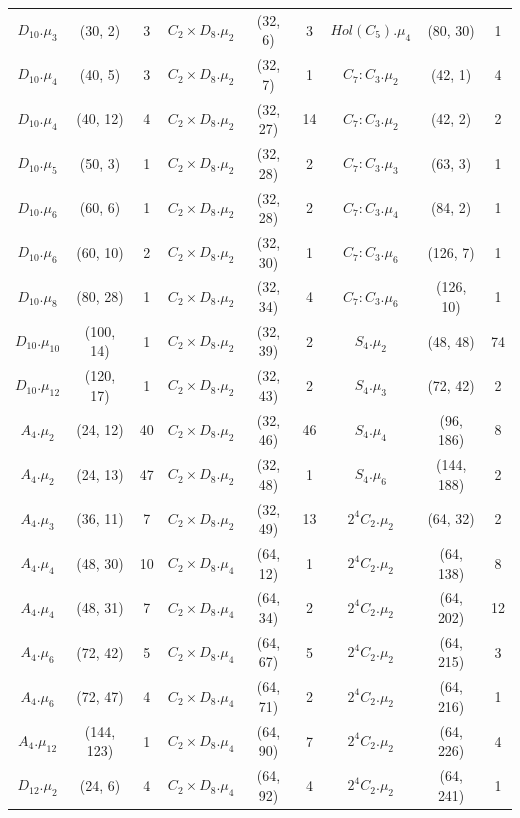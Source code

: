 {\begin{longtable}{ccc|ccc|ccc}
\rowcolor{lightgray}
$D_{10}.\mu_{3}$&(30, 2)&3 & $C_2 \times D_8.\mu_{2}$&(32, 6)&3 & $Hol(C_5).\mu_{4}$&(80, 30)&1\\
$D_{10}.\mu_{4}$&(40, 5)&3 & $C_2 \times D_8.\mu_{2}$&(32, 7)&1 & $C_7:C_3.\mu_{2}$&(42, 1)&4\\
\rowcolor{lightgray}
$D_{10}.\mu_{4}$&(40, 12)&4 & $C_2 \times D_8.\mu_{2}$&(32, 27)&14 & $C_7:C_3.\mu_{2}$&(42, 2)&2\\
$D_{10}.\mu_{5}$&(50, 3)&1 & $C_2 \times D_8.\mu_{2}$&(32, 28)&2 & $C_7:C_3.\mu_{3}$&(63, 3)&1\\
\rowcolor{lightgray}
$D_{10}.\mu_{6}$&(60, 6)&1 & $C_2 \times D_8.\mu_{2}$&(32, 28)&2 & $C_7:C_3.\mu_{4}$&(84, 2)&1\\
$D_{10}.\mu_{6}$&(60, 10)&2 & $C_2 \times D_8.\mu_{2}$&(32, 30)&1 & $C_7:C_3.\mu_{6}$&(126, 7)&1\\
\rowcolor{lightgray}
$D_{10}.\mu_{8}$&(80, 28)&1 & $C_2 \times D_8.\mu_{2}$&(32, 34)&4 & $C_7:C_3.\mu_{6}$&(126, 10)&1\\
$D_{10}.\mu_{10}$&(100, 14)&1 & $C_2 \times D_8.\mu_{2}$&(32, 39)&2 & $S_4.\mu_{2}$&(48, 48)&74\\
\rowcolor{lightgray}
$D_{10}.\mu_{12}$&(120, 17)&1 & $C_2 \times D_8.\mu_{2}$&(32, 43)&2 & $S_4.\mu_{3}$&(72, 42)&2\\
$A_4.\mu_{2}$&(24, 12)&40 & $C_2 \times D_8.\mu_{2}$&(32, 46)&46 & $S_4.\mu_{4}$&(96, 186)&8\\
\rowcolor{lightgray}
$A_4.\mu_{2}$&(24, 13)&47 & $C_2 \times D_8.\mu_{2}$&(32, 48)&1 & $S_4.\mu_{6}$&(144, 188)&2\\
$A_4.\mu_{3}$&(36, 11)&7 & $C_2 \times D_8.\mu_{2}$&(32, 49)&13 & $2^4C_2.\mu_{2}$&(64, 32)&2\\
\rowcolor{lightgray}
$A_4.\mu_{4}$&(48, 30)&10 & $C_2 \times D_8.\mu_{4}$&(64, 12)&1 & $2^4C_2.\mu_{2}$&(64, 138)&8\\
$A_4.\mu_{4}$&(48, 31)&7 & $C_2 \times D_8.\mu_{4}$&(64, 34)&2 & $2^4C_2.\mu_{2}$&(64, 202)&12\\
\rowcolor{lightgray}
$A_4.\mu_{6}$&(72, 42)&5 & $C_2 \times D_8.\mu_{4}$&(64, 67)&5 & $2^4C_2.\mu_{2}$&(64, 215)&3\\
$A_4.\mu_{6}$&(72, 47)&4 & $C_2 \times D_8.\mu_{4}$&(64, 71)&2 & $2^4C_2.\mu_{2}$&(64, 216)&1\\
\rowcolor{lightgray}
$A_4.\mu_{12}$&(144, 123)&1 & $C_2 \times D_8.\mu_{4}$&(64, 90)&7 & $2^4C_2.\mu_{2}$&(64, 226)&4\\
$D_{12}.\mu_{2}$&(24, 6)&4 & $C_2 \times D_8.\mu_{4}$&(64, 92)&4 & $2^4C_2.\mu_{2}$&(64, 241)&1\\

\end{longtable}}
